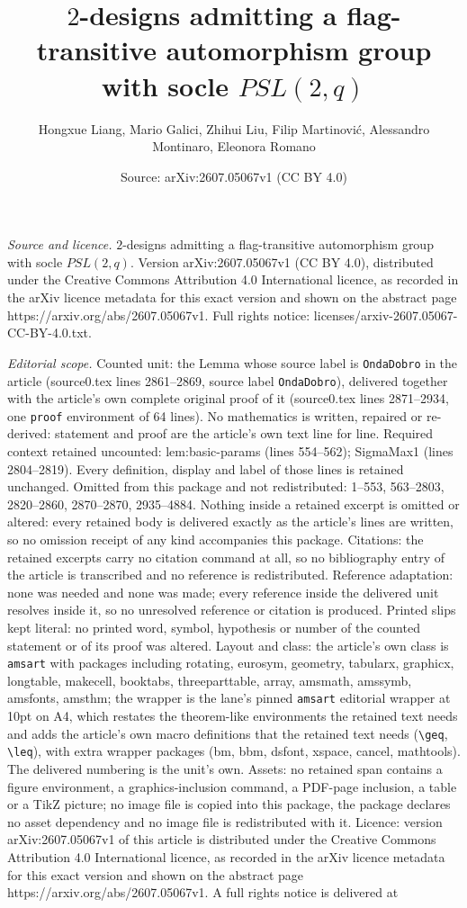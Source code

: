 \documentclass[10pt,a4paper]{amsart}
\title[$2$-designs admitting a flag-transitive automorphism group w]{$2$-designs admitting a flag-transitive automorphism group with socle $PSL(2,q)$}
\author{Hongxue Liang, Mario Galici, Zhihui Liu, Filip Martinovi\'c, Alessandro Montinaro, Eleonora Romano}
\date{Source: arXiv:2607.05067v1 (CC BY 4.0)}
\begin{document}
\maketitle

\noindent\emph{Source and licence.} $2$-designs admitting a flag-transitive automorphism group with socle $PSL(2,q)$. Version arXiv:2607.05067v1 (CC BY 4.0), distributed under the Creative Commons Attribution 4.0 International licence, as recorded in the arXiv licence metadata for this exact version and shown on the abstract page https://arxiv.org/abs/2607.05067v1. Full rights notice: licenses/arxiv-2607.05067-CC-BY-4.0.txt.\par\smallskip

\noindent\textit{Editorial scope.} Counted unit: the Lemma whose source label is \texttt{OndaDobro} in the article (source0.tex lines 2861--2869, source label \texttt{OndaDobro}), delivered together with the article's own complete original proof of it (source0.tex lines 2871--2934, one \texttt{proof} environment of 64 lines). No mathematics is written, repaired or re-derived: statement and proof are the article's own text line for line. Required context retained uncounted: lem:basic-params (lines 554--562); SigmaMax1 (lines 2804--2819). Every definition, display and label of those lines is retained unchanged. Omitted from this package and not redistributed: 1--553, 563--2803, 2820--2860, 2870--2870, 2935--4884. Nothing inside a retained excerpt is omitted or altered: every retained body is delivered exactly as the article's lines are written, so no omission receipt of any kind accompanies this package. Citations: the retained excerpts carry no citation command at all, so no bibliography entry of the article is transcribed and no reference is redistributed. Reference adaptation: none was needed and none was made; every reference inside the delivered unit resolves inside it, so no unresolved reference or citation is produced. Printed slips kept literal: no printed word, symbol, hypothesis or number of the counted statement or of its proof was altered. Layout and class: the article's own class is \texttt{amsart} with packages including rotating, eurosym, geometry, tabularx, graphicx, longtable, makecell, booktabs, threeparttable, array, amsmath, amssymb, amsfonts, amsthm; the wrapper is the lane's pinned \texttt{amsart} editorial wrapper at 10pt on A4, which restates the theorem-like environments the retained text needs and adds the article's own macro definitions that the retained text needs (\texttt{\textbackslash geq}, \texttt{\textbackslash leq}), with extra wrapper packages (bm, bbm, dsfont, xspace, cancel, mathtools). The delivered numbering is the unit's own. Assets: no retained span contains a figure environment, a graphics-inclusion command, a PDF-page inclusion, a table or a TikZ picture; no image file is copied into this package, the package declares no asset dependency and no image file is redistributed with it. Licence: version arXiv:2607.05067v1 of this article is distributed under the Creative Commons Attribution 4.0 International licence, as recorded in the arXiv licence metadata for this exact version and shown on the abstract page https://arxiv.org/abs/2607.05067v1. A full rights notice is delivered at 
\end{document}
